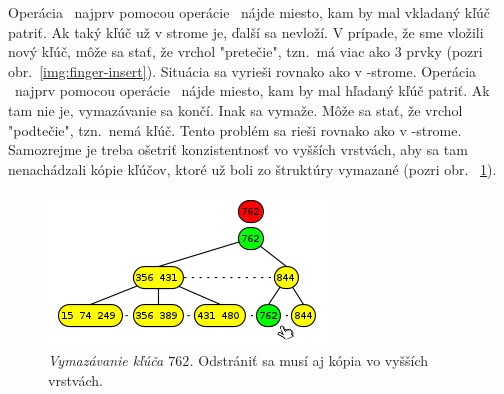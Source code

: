 
Operácia \ins\ najprv pomocou operácie \find\ nájde miesto, kam by mal vkladaný kľúč patriť. 
Ak taký kľúč už v strome je, ďalší sa nevloží. V prípade, že sme vložili nový kľúč, môže sa stať, 
že vrchol "pretečie", tzn.\ má viac ako 3 prvky%
(pozri obr.~\ref{img:finger-insert}). Situácia sa vyrieši rovnako ako v \Bp-strome. 
Operácia \delete\ najprv pomocou operácie \find\ nájde miesto, kam by mal hľadaný kľúč patriť. 
Ak tam nie je, vymazávanie sa končí. Inak sa vymaže. Môže sa stať, že vrchol "podtečie", tzn.\ 
nemá kľúč. Tento problém sa rieši rovnako ako v \Bp-strome. 
Samozrejme je treba ošetriť konzistentnosť vo vyšších vrstvách, aby sa tam nenachádzali kópie 
kľúčov, ktoré už boli zo štruktúry vymazané (pozri obr. ~\ref{img:finger-delete}).  

\begin{figure}
\includegraphics[width=\columnwidth]{obrazky/finger-delete.png}
\caption{\emph{Vymazávanie kľúča $762$.} Odstrániť sa musí aj kópia vo vyšších vrstvách.}
\label{img:finger-delete}
\end{figure}


